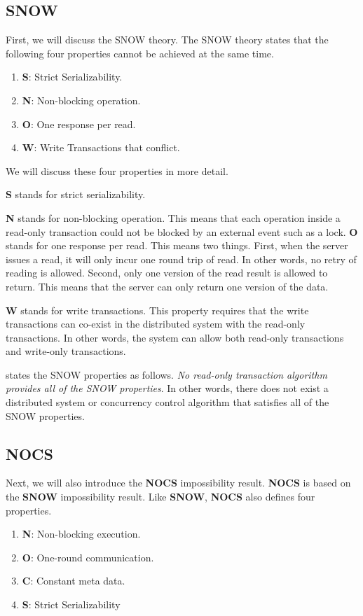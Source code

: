 \subsection{SNOW}
First, we will discuss the SNOW theory. The SNOW theory states that the following four properties cannot be achieved at the same time.
\begin{enumerate}
    \item \textbf{S}: Strict Serializability.
    \item \textbf{N}: Non-blocking operation.
    \item \textbf{O}: One response per read.
    \item \textbf{W}: Write Transactions that conflict.
\end{enumerate}

We will discuss these four properties in more detail.


\textbf{S} stands for strict serializability.

\textbf{N} stands for non-blocking operation. This means that each operation inside a read-only transaction could not be blocked by an external event such as a lock. 
\textbf{O} stands for one response per read. This means two things. First, when the server issues a read, it will only incur one round trip of read. In other words, no retry of reading is allowed. Second, only one version of the read result is allowed to return. This means that the server can only return one version of the data. 

\textbf{W} stands for write transactions. This property requires that the write transactions can co-exist in the distributed system with the read-only transactions. In other words, the system can allow both read-only transactions and write-only transactions.

\cite{lu2016snow} states the SNOW properties as follows.
\textit{No read-only transaction algorithm provides all of the SNOW properties}. In other words, there does not exist a distributed system or concurrency control algorithm that satisfies all of the SNOW properties.


\subsection{NOCS}
Next, we will also introduce the \textbf{NOCS} impossibility result. \textbf{NOCS} is based on the \textbf{SNOW} impossibility result. Like \textbf{SNOW}, \textbf{NOCS} also defines four properties.

\begin{enumerate}
    \item \textbf{N}: Non-blocking execution.
    \item \textbf{O}: One-round communication.
    \item \textbf{C}: Constant meta data.
    \item \textbf{S}: Strict Serializability
\end{enumerate}

